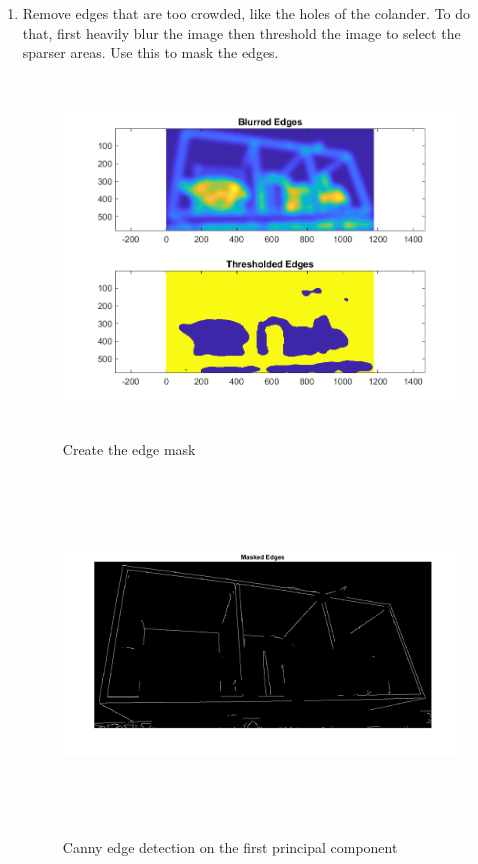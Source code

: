 \begin{enumerate}
    \item Remove edges that are too crowded, like the holes of the colander. To do that, first heavily blur the image then threshold the image to select the sparser areas. Use this to mask the edges.

                \begin{figure}[H]
    \centering
    \includegraphics[height=9.5cm, width=\textwidth, keepaspectratio]{Report/Images/Features/Lines/ThresholdedEdges.png}
    \caption{\label{fig:lines:mask}Create the edge mask}
    \end{figure}
    
                \begin{figure}[H]
    \centering
    \includegraphics[height=9.5cm, width=\textwidth, keepaspectratio]{Report/Images/Features/Lines/MaskedEdges.png}
    \caption{\label{fig:lines:edge}Canny edge detection on the first principal component}
    \end{figure}


\end{enumerate}
